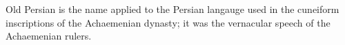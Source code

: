 



    Old Persian is the name applied to the Persian langauge used in the cuneiform inscriptions of the Achaemenian dynasty; it was the vernacular speech of the Achaemenian rulers.

    
    
    

    
    \nocite{*}
    


